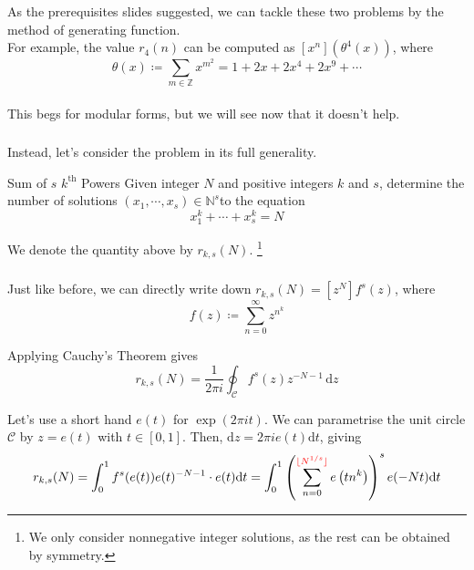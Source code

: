 \begin{frame}\frametitle{\insertsubsection}
As the prerequisites slides suggested, we can tackle these two problems by the method of generating function.
\pause \\[5px]

For example, the value \(r_4(n)\) can be computed as \([x^n]\left(\theta^4(x)\right)\), where
\[
  \theta(x) \coloneqq \sum_{m \in \mathbb{Z}} x^{m^2} = 1 + 2x + 2x^4 + 2x^9 + \cdots
\]
\pause \\[5px]

This begs for modular forms, but we will see now that it doesn't help.
\end{frame}

\begin{frame}\frametitle{\insertsubsection}
Instead, let's consider the problem in its full generality.

\begin{block}{Sum of \(s\) \(k^{\text{th}}\) Powers}
  Given integer \(N\) and positive integers \(k\) and \(s\), determine the number of solutions \((x_1, \cdots, x_s) \in \mathbb{N}^s\)\footnotemark to the equation
\[
  x_1^k + \cdots + x_s^k = N
\]
\end{block}
We denote the quantity above by \(r_{k, s}(N)\).
\footnote[frame]{We only consider nonnegative integer solutions, as the rest can be obtained by symmetry.}
\end{frame}

\begin{frame}\frametitle{\insertsubsection}
Just like before, we can directly write down \(r_{k, s}(N) = [z^N]f^s(z)\), where
\[
  f(z) \coloneqq \sum_{n = 0}^{\infty} z^{n^k}
\]
\pause

Applying Cauchy's Theorem gives
\[
  r_{k, s}(N) = \frac{1}{2\pi i}\oint_{\mathcal{C}} f^s(z)z^{-N - 1} \, \mathrm{d}z
\]
\pause

Let's use a short hand \(e(t)\) for \(\exp(2\pi it)\). We can parametrise the unit circle \(\mathcal{C}\) by \(z = e(t)\) with \(t \in [0, 1]\). Then, \(\mathrm{d}z = 2\pi ie(t)\mathrm{d}t\), giving
\[
  r_{k, s}(N) = \int_0^1 f^s(e(t))e(t)^{-N - 1} \cdot e(t)\mathrm{d}t = \int_0^1 \left(\sum_{n = 0}^{{\color{red} \lfloor N^{1 / s} \rfloor}} e\left(tn^k\right)\right)^s e(-Nt)\mathrm{d}t
\]
\end{frame}
